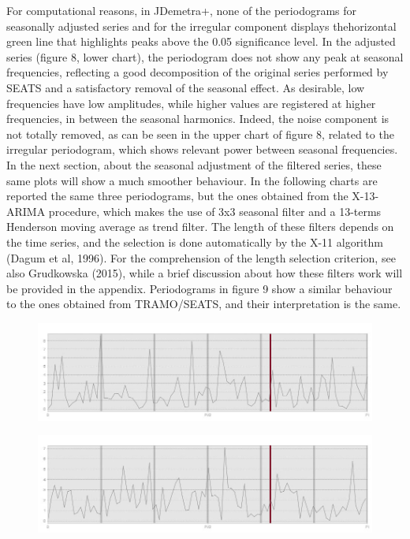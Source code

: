 \documentclass{article}
\begin{document}
For computational reasons, in JDemetra+, none of the periodograms for seasonally adjusted series and for the irregular component displays thehorizontal green line that highlights peaks above the 0.05 significance level. In the adjusted series (figure 8, lower chart), the periodogram does not show any peak at seasonal frequencies, reflecting a good decomposition of the original series performed by SEATS and a satisfactory removal of the seasonal effect. As desirable, low frequencies have low amplitudes, while higher values are registered at higher frequencies, in between the seasonal harmonics. Indeed, the noise component is not totally removed, as can be seen in the upper chart of figure 8, related to the irregular periodogram, which shows relevant power between seasonal frequencies. In the next section, about the seasonal adjustment of the filtered series, these same plots will show a much smoother behaviour. In the following charts are reported the same three periodograms, but the ones obtained from the X-13-ARIMA procedure, which makes the use of 3x3 seasonal filter and a 13-terms Henderson moving average as trend filter. The length of these filters depends on the time series, and the selection is done automatically by the X-11 algorithm (Dagum et al, 1996). For the comprehension of the length selection criterion, see also Grudkowska (2015), while a brief discussion about how these filters work will be provided in the appendix. Periodograms in figure 9 show a similar behaviour to the ones obtained from TRAMO/SEATS, and their interpretation is the same. 
\begin{figure}[H]
  \includegraphics[width=\linewidth]{../images/capitolo3/XperRES.jpg} 
  \label{fig:1}
\end{figure}
\begin{figure}[H]
  \includegraphics[width=\linewidth]{../images/capitolo3/XperIRR.jpg} 
  \label{fig:1}
\end{figure}
\end{document}
